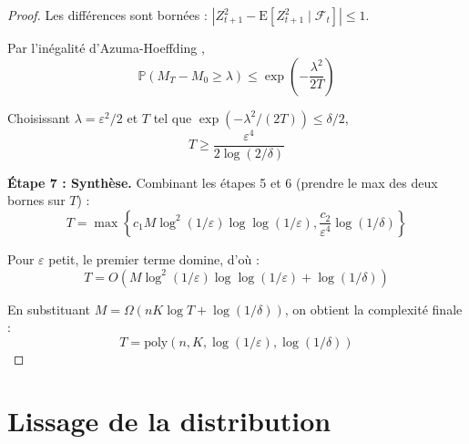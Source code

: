 \documentclass[12pt,a4paper]{article}
\theoremstyle{definition}
\theoremstyle{remark}
\newcommand{\E}{\text{E}}
\newcommand{\Prob}{\mathbb{P}}
\begin{document}
\begin{proof}
		Les différences sont bornées : $|Z_{t+1}^2 - \E[Z_{t+1}^2 \mid \mathcal{F}_t]| \leq 1$.
		
		Par l'inégalité d'Azuma-Hoeffding \cite{boucheron2013concentration},
		\begin{equation}
			\Prob(M_T - M_0 \geq \lambda) \leq \exp\left(-\frac{\lambda^2}{2T}\right)
		\end{equation}
		
		Choisissant $\lambda = \varepsilon^2/2$ et $T$ tel que $\exp(-\lambda^2/(2T)) \leq \delta/2$,
		\begin{equation}
			T \geq \frac{\varepsilon^4}{2\log(2/\delta)}
		\end{equation}
		
		\textbf{Étape 7 : Synthèse.}
		Combinant les étapes 5 et 6 (prendre le max des deux bornes sur $T$) :
		\begin{equation}
			T = \max\left\{c_1 M \log^2(1/\varepsilon) \log\log(1/\varepsilon), \frac{c_2}{\varepsilon^4}\log(1/\delta)\right\}
		\end{equation}
		
		Pour $\varepsilon$ petit, le premier terme domine, d'où :
		\begin{equation}
			T = O\left(M \log^2(1/\varepsilon) \log\log(1/\varepsilon) + \log(1/\delta)\right)
		\end{equation}
		
		En substituant $M = \Omega(nK \log T + \log(1/\delta))$, on obtient la complexité finale :
		\begin{equation}
			T = \text{poly}(n, K, \log(1/\varepsilon), \log(1/\delta))
		\end{equation}
	\end{proof}
	

	
	\printbibliography[title={Bibliographie}]


\appendix

\section{Lissage de la distribution }
\label{sec:smoothing}
\end{document}
